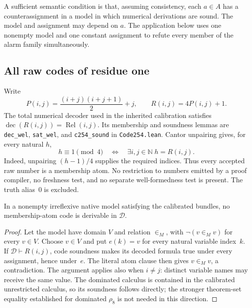 A sufficient semantic condition is that, assuming consistency, each
$a\in A$ has a counterassignment in a model in which numerical
derivations are sound.  The model and assignment may depend on $a$.
The application below uses one nonempty model and one constant assignment
to refute every member of the alarm family simultaneously.

\subsection{All raw codes of residue one}

Write
\[
 P(i,j)=\frac{(i+j)(i+j+1)}2+j,
 \qquad R(i,j)=4P(i,j)+1.
\]
The total numerical decoder used in the inherited calibration satisfies
$\operatorname{dec}(R(i,j))=\operatorname{Rel}(i,j)$.
Its membership and soundness lemmas are \texttt{dec\_wel},
\texttt{sat\_wel}, and \texttt{c254\_sound} in
\texttt{Code254.lean}.\cite{code254}
Cantor unpairing gives, for every natural $h$,
\[
 h\equiv1\pmod4
 \quad\Longleftrightarrow\quad
 \exists i,j\in\mathbb N\;h=R(i,j).
\]
Indeed, unpairing $(h-1)/4$ supplies the required indices.  Thus every
accepted raw number is a membership atom.  No restriction to numbers
emitted by a proof compiler, no freshness test, and no separate
well-formedness test is present.  The truth alias~$0$ is excluded.

\begin{lemma}
In a nonempty irreflexive native model satisfying the calibrated bundles,
no membership-atom code is derivable in $\mathcal D$.
\end{lemma}

\begin{proof}
Let the model have domain $V$ and relation $\in_M$, with
$\neg(v\in_M v)$ for every $v\in V$.  Choose $v\in V$ and put
$e(k)=v$ for every natural variable index~$k$.
If $\mathcal D\vdash R(i,j)$, code soundness makes its decoded formula
true under every assignment, hence under~$e$.  The literal atom clause
then gives $v\in_M v$, a contradiction.  The argument applies also when
$i\ne j$: distinct variable names may receive the same value.
The dominated calculus is contained in the calibrated unrestricted
calculus, so its soundness follows directly; the stronger theorem-set
equality established for dominated $\rho_8$ is not needed in this
direction.\cite{dominated}
\end{proof}

